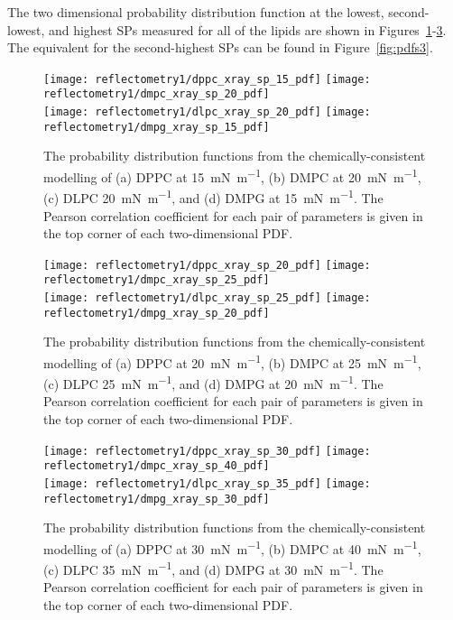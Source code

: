 %
The two dimensional probability distribution function at the lowest, second-lowest, and highest SPs measured for all of the lipids are shown in Figures~\ref{fig:pdfs1}-\ref{fig:pdfs4}. The equivalent for the second-highest SPs can be found in Figure~\ref{fig:pdfs3}.
%
\begin{figure}
    \centering
    \texttt{[image: reflectometry1/dppc\_xray\_sp\_15\_pdf]}
    \texttt{[image: reflectometry1/dmpc\_xray\_sp\_20\_pdf]} \\
    \texttt{[image: reflectometry1/dlpc\_xray\_sp\_20\_pdf]}
    \texttt{[image: reflectometry1/dmpg\_xray\_sp\_15\_pdf]}
    \caption{The probability distribution functions from the chemically-consistent modelling of (a) DPPC at \SI{15}{\milli\newton\per\meter}, (b) DMPC at \SI{20}{\milli\newton\per\meter}, (c) DLPC \SI{20}{\milli\newton\per\meter}, and (d) DMPG at \SI{15}{\milli\newton\per\meter}. The Pearson correlation coefficient for each pair of parameters is given in the top corner of each two-dimensional PDF.}
    \label{fig:pdfs1}
\end{figure}
%
%
\begin{figure}
    \centering
    \texttt{[image: reflectometry1/dppc\_xray\_sp\_20\_pdf]}
    \texttt{[image: reflectometry1/dmpc\_xray\_sp\_25\_pdf]} \\
    \texttt{[image: reflectometry1/dlpc\_xray\_sp\_25\_pdf]}
    \texttt{[image: reflectometry1/dmpg\_xray\_sp\_20\_pdf]}
    \caption{The probability distribution functions from the chemically-consistent modelling of (a) DPPC at \SI{20}{\milli\newton\per\meter}, (b) DMPC at \SI{25}{\milli\newton\per\meter}, (c) DLPC \SI{25}{\milli\newton\per\meter}, and (d) DMPG at \SI{20}{\milli\newton\per\meter}. The Pearson correlation coefficient for each pair of parameters is given in the top corner of each two-dimensional PDF.}
    \label{fig:pdfs2}
\end{figure}
%
%
\begin{figure}
    \centering
    \texttt{[image: reflectometry1/dppc\_xray\_sp\_30\_pdf]}
    \texttt{[image: reflectometry1/dmpc\_xray\_sp\_40\_pdf]} \\
    \texttt{[image: reflectometry1/dlpc\_xray\_sp\_35\_pdf]}
    \texttt{[image: reflectometry1/dmpg\_xray\_sp\_30\_pdf]}
    \caption{The probability distribution functions from the chemically-consistent modelling of (a) DPPC at \SI{30}{\milli\newton\per\meter}, (b) DMPC at \SI{40}{\milli\newton\per\meter}, (c) DLPC \SI{35}{\milli\newton\per\meter}, and (d) DMPG at \SI{30}{\milli\newton\per\meter}. The Pearson correlation coefficient for each pair of parameters is given in the top corner of each two-dimensional PDF.}
    \label{fig:pdfs4}
\end{figure}
